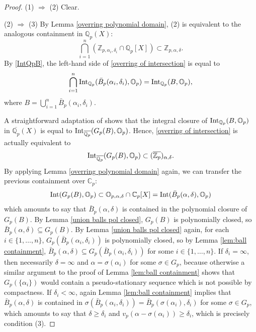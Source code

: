 \documentclass[10pt]{article}
\numberwithin{equation}{section}
\theoremstyle{definition}
\theoremstyle{definition}
\newcommand{\Q}{\mathbb{Q}}
\newcommand{\Z}{\mathbb{Z}}
\newcommand{\C}{\mathbb{C}}
\renewcommand{\O}{\mathbb{O}}
\newcommand{\Int}{\textnormal{Int}}
\newcommand{\oQp}{\overline{\Q_p}}
\newcommand{\oZp}{\overline{\Z_p}}
\newcommand\rc { \color{red}}
\begin{document}

\begin{proof}
 (1) $\Rightarrow$ (2) Clear. 
 
 (2) $\Rightarrow$ (3) By Lemma \ref{overring polynomial domain}, (2) is equivalent to the analogous containment in $\Q_p(X)$:
\begin{equation}\label{overring of intersection}
\bigcap_{i=1}^n(\Z_{p,\alpha_i,\delta_i}\cap\Q_p[X])\subset\Z_{p,\alpha,\delta}.
\end{equation}
By \eqref{IntQpB}, the left-hand side of \eqref{overring of intersection} is equal to
$$\bigcap_{i=1}^n\Int_{\Q_p}(\bar B_p(\alpha_i,\delta_i),\O_p)=\Int_{\Q_p}(B,\O_p),$$
where $B=\bigcup\limits_{i=1}^n \bar B_p(\alpha_i,\delta_i)$.

A straightforward adaptation of \cite[Lemma 2.20]{PerDedekind} shows that 
the integral closure of $\Int_{\Q_p}(B,\O_p)$ in $\oQp(X)$ is equal to $\Int_{\oQp}(G_p(B),\O_p)$. Hence, \eqref{overring of intersection} is actually equivalent to
$$\Int_{\oQp}(G_p(B),\O_p)\subset (\oZp)_{\alpha,\delta}.$$
By applying Lemma \ref{overring polynomial domain} again, we can transfer the previous containment over $\C_p$:
$$\Int(G_p(B),\O_p)\subset\O_{p,\alpha,\delta}\cap\C_p[X]=\Int(\bar B_p(\alpha,\delta),\O_p)$$
which amounts to say that $\bar B_p(\alpha,\delta)$ is contained in the polynomial closure of $G_p(B)$. By Lemma \ref{union balls pol closed}, $G_p(B)$ is polynomially closed, so $\bar B_p(\alpha,\delta)\subseteq G_p(B)$. By Lemma \ref{union balls pol closed} again, 
for each $i\in\{1,\ldots,n\}$, $G_p(\bar B_p(\alpha_i,\delta_i))$ is polynomially closed, 
so by Lemma \ref{lem:ball containment}, $\bar B_p(\alpha,\delta)\subseteq G_p(\bar B_p(\alpha_i,\delta_i))$ for some $i\in\{1,\ldots,n\}$. 
If $\delta_i=\infty$, then necessarily $\delta=\infty$ and $\alpha=\sigma(\alpha_i)$ for some $\sigma\in G_p$, 
because otherwise a similar argument to the proof of Lemma \ref{lem:ball containment} shows 
that $G_p(\{\alpha_i\})$ would contain a pseudo-stationary sequence which is not possible by compactness.  
If $\delta_i<\infty$, again Lemma \ref{lem:ball containment} implies that $\bar B_p(\alpha,\delta)$ is contained 
in $\sigma(\bar B_p(\alpha_i,\delta_i))=\bar B_p(\sigma(\alpha_i),\delta_i)$ for some $\sigma\in G_p$, 
which amounts to say that $\delta\geq\delta_i$ and $v_p(\alpha-\sigma(\alpha_i))\geq\delta_i$, which is precisely condition (3).


\end{proof}
\end{document}
